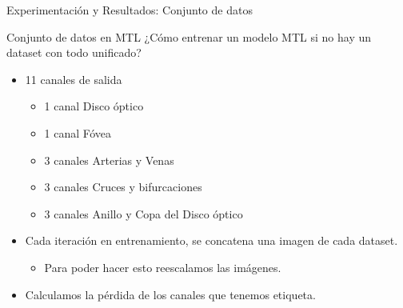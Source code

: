 \documentclass[xcolor=dvipsnames,table]{beamer}
\begin{document}
\begin{frame}{Experimentación y Resultados: Conjunto de datos}
	\begin{block}{Conjunto de datos en MTL}
¿Cómo entrenar un modelo MTL si no hay un dataset con todo unificado?
		\begin{itemize}
			\item 11 canales de salida
			\begin{itemize}
				\item 1 canal Disco óptico
				\item 1 canal Fóvea
				\item 3 canales Arterias y Venas
				\item 3 canales Cruces y bifurcaciones
				\item 3 canales Anillo y Copa del Disco óptico
			\end{itemize}				
		\item Cada iteración en entrenamiento, se concatena una imagen de cada dataset.
		\begin{itemize}
			\item Para poder hacer esto reescalamos las imágenes.
		\end{itemize}
		\item Calculamos la pérdida de los canales que tenemos etiqueta.
		\end{itemize}
	\end{block}
\end{frame}
\end{document}
